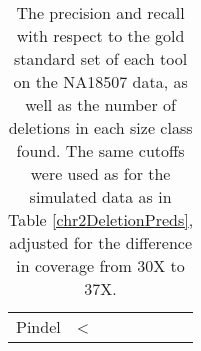 \begin{table}[t]
\begin{center}
\begin{tabular}{rrr|rrrrr}
  Pindel & <%
   \hline
\end{tabular}
\end{center}
\caption{The precision and recall with respect to the gold standard set of each tool on the NA18507 data, as well as the number of deletions in each size class found. The same cutoffs were used as for the simulated data as in Table \ref{chr2DeletionPreds}, adjusted for the difference in coverage from 30X to 37X.}
\label{NA18507DeletionPreds}
\end{table}
